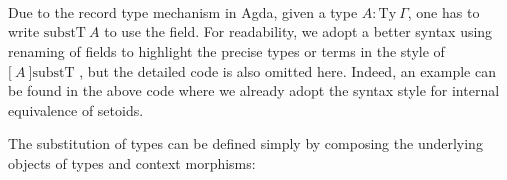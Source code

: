 \begin{code}
%
\\
\>  \AgdaSymbol{\{} \AgdaSymbol{:} \AgdaSymbol{\}(} \AgdaSymbol{:}  \AgdaSymbol{)} \AgdaSymbol{:}  \<%
\\
\>[0]\<[2]%
\>[2] \<%
\\
\>[0]\<[2]%
\>[2]\<%
\\
\>[2]\<[4]%
\>[4] \<[10]%
\>[10]\AgdaSymbol{:} \AgdaSymbol{(} \AgdaSymbol{:}   \AgdaSymbol{)}   \AgdaFunction{[}  \AgdaFunction{]fm}  \<%
\\
\>[2]\<[4]%
\>[4] \AgdaSymbol{:}  \AgdaSymbol{\{}  \AgdaSymbol{:}   \AgdaSymbol{\}}  \<[30]%
\>[30]\<%
\\
\>[4]\<[10]%
\>[10]\AgdaSymbol{(} \AgdaSymbol{:} \AgdaFunction{[}  \AgdaFunction{]}   \AgdaSymbol{)}  \<[30]%
\>[30]\<%
\\
\>[4]\<[10]%
\>[10]\AgdaFunction{[} \AgdaFunction{[}  \AgdaFunction{]fm}  \AgdaFunction{]} \AgdaFunction{[}  \AgdaFunction{]subst}  \AgdaSymbol{(} \AgdaSymbol{)}   \<%
\\
\end{code}


Due to the record type mechanism in Agda, given a type $A : \text{Ty} ~\Gamma$, one has to write $\text{substT} ~A$ to use the field. For readability, we adopt a better syntax using renaming of fields to highlight the precise types or terms in the style of $\text{[} ~A ~\text{]substT}$ , but the detailed code is also omitted here. Indeed, an example can be found in the above code where we already adopt the syntax style for internal equivalence of setoids.


The substitution of types can be defined simply by composing the underlying objects of types and context morphisms:

